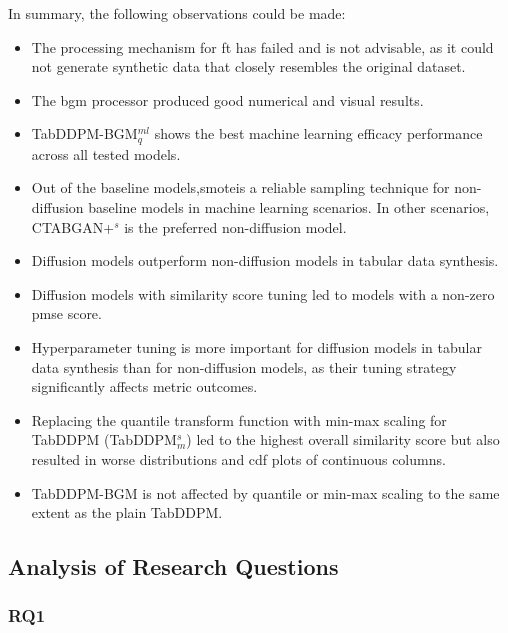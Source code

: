 In summary, the following observations could be made:

\begin{itemize}
	\item The processing mechanism for \gls{ft} has failed and is not advisable, as it could not generate synthetic data that closely resembles the original dataset.
	\item The \gls{bgm} processor produced good numerical and visual results.
	\item TabDDPM-BGM$^{ml}_q$ shows the best machine learning efficacy performance across all tested models.
	\item Out of the baseline models,\gls{smote}is a reliable sampling technique for non-diffusion baseline models in machine learning scenarios.
	      In other scenarios, CTABGAN+$^{s}$ is the preferred non-diffusion model.
	\item Diffusion models outperform non-diffusion models in tabular data synthesis.
	\item Diffusion models with similarity score tuning led to models with a non-zero \gls{pmse} score.
	\item Hyperparameter tuning is more important for diffusion models in tabular data synthesis than for non-diffusion models, as their tuning strategy significantly affects metric outcomes.
	\item Replacing the quantile transform function with min-max scaling for TabDDPM (TabDDPM$^{s}_m$) led to the highest overall similarity score but also resulted in worse distributions and \gls{cdf} plots of continuous columns.
	\item TabDDPM-BGM is not affected by quantile or min-max scaling to the same extent as the plain TabDDPM.
\end{itemize}
\newpage

\subsection*{Analysis of Research Questions}

\subsubsection{RQ1}

